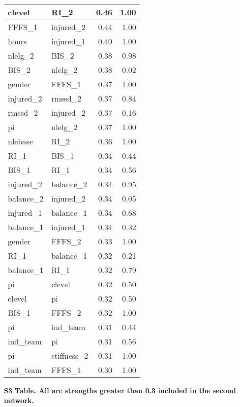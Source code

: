 \documentclass[
]{article}
\begin{document}
\begin{longtable}[t]{l|l|r|r}
\hline
clevel & RI\_2 & 0.46 & 1.00\\
\hline
FFFS\_1 & injured\_2 & 0.44 & 1.00\\
\hline
hours & injured\_1 & 0.40 & 1.00\\
\hline
nlelg\_2 & BIS\_2 & 0.38 & 0.98\\
\hline
BIS\_2 & nlelg\_2 & 0.38 & 0.02\\
\hline
gender & FFFS\_1 & 0.37 & 1.00\\
\hline
injured\_2 & rmssd\_2 & 0.37 & 0.84\\
\hline
rmssd\_2 & injured\_2 & 0.37 & 0.16\\
\hline
pi & nlelg\_2 & 0.37 & 1.00\\
\hline
nlebase & RI\_2 & 0.36 & 1.00\\
\hline
RI\_1 & BIS\_1 & 0.34 & 0.44\\
\hline
BIS\_1 & RI\_1 & 0.34 & 0.56\\
\hline
injured\_2 & balance\_2 & 0.34 & 0.95\\
\hline
balance\_2 & injured\_2 & 0.34 & 0.05\\
\hline
injured\_1 & balance\_1 & 0.34 & 0.68\\
\hline
balance\_1 & injured\_1 & 0.34 & 0.32\\
\hline
gender & FFFS\_2 & 0.33 & 1.00\\
\hline
RI\_1 & balance\_1 & 0.32 & 0.21\\
\hline
balance\_1 & RI\_1 & 0.32 & 0.79\\
\hline
pi & clevel & 0.32 & 0.50\\
\hline
clevel & pi & 0.32 & 0.50\\
\hline
BIS\_1 & FFFS\_2 & 0.32 & 1.00\\
\hline
pi & ind\_team & 0.31 & 0.44\\
\hline
ind\_team & pi & 0.31 & 0.56\\
\hline
pi & stiffness\_2 & 0.31 & 1.00\\
\hline
ind\_team & FFFS\_1 & 0.30 & 1.00\\
\hline
\end{longtable}

\newpage

\textbf{S3 Table. All arc strengths greater than 0.3 included in the second network.}
\end{document}
